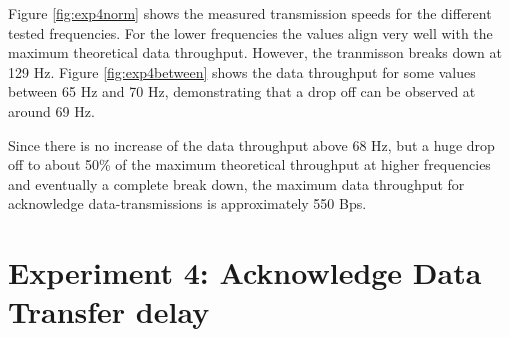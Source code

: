 \begin{description}
	Figure \ref{fig:exp4norm} shows the measured transmission speeds for the different tested frequencies. For the lower frequencies the values align very well with the maximum theoretical data throughput. However, the tranmisson breaks down at 129 Hz. Figure \ref{fig:exp4between} shows the data throughput for some values between 65 Hz and 70 Hz, demonstrating that a drop off can be observed at around 69 Hz. 
	
	Since there is no increase of the data throughput above 68 Hz, but a huge drop off to about 50\% of the maximum theoretical throughput at higher frequencies and eventually a complete break down, the maximum data throughput for acknowledge data-transmissions is approximately 550 Bps.
\end{description}
\newpage

\section{Experiment 4: Acknowledge Data Transfer delay}
